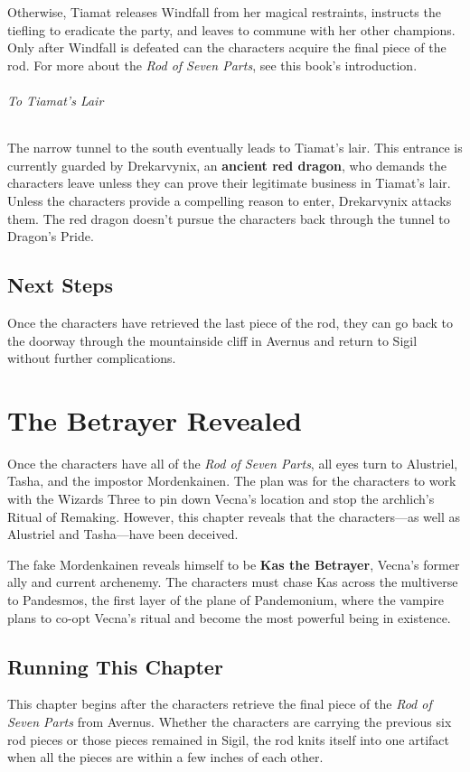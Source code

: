 \documentclass[10pt,a4paper,twoside,bg=print,twocolumn,openany,nodeprecatedcode]{dndbook}
\begin{document}
Otherwise, Tiamat releases Windfall from her magical restraints, instructs the tiefling to eradicate the party, and leaves to commune with her other champions. Only after Windfall is defeated can the characters acquire the final piece of the rod. For more about the \textit{Rod of Seven Parts}, see this book's introduction.

\subparagraph{To Tiamat's Lair}
The narrow tunnel to the south eventually leads to Tiamat's lair. This entrance is currently guarded by Drekarvynix, an \textbf{ancient red dragon}, who demands the characters leave unless they can prove their legitimate business in Tiamat's lair. Unless the characters provide a compelling reason to enter, Drekarvynix attacks them. The red dragon doesn't pursue the characters back through the tunnel to Dragon's Pride.

\section{Next Steps}
Once the characters have retrieved the last piece of the rod, they can go back to the doorway through the mountainside cliff in Avernus and return to Sigil without further complications.

\chapter{The Betrayer Revealed}
Once the characters have all of the \textit{Rod of Seven Parts}, all eyes turn to Alustriel, Tasha, and the impostor Mordenkainen. The plan was for the characters to work with the Wizards Three to pin down Vecna's location and stop the archlich's Ritual of Remaking. However, this chapter reveals that the characters—as well as Alustriel and Tasha—have been deceived.

The fake Mordenkainen reveals himself to be \textbf{Kas the Betrayer}, Vecna's former ally and current archenemy. The characters must chase Kas across the multiverse to Pandesmos, the first layer of the plane of Pandemonium, where the vampire plans to co-opt Vecna's ritual and become the most powerful being in existence.

\section{Running This Chapter}
This chapter begins after the characters retrieve the final piece of the \textit{Rod of Seven Parts} from Avernus. Whether the characters are carrying the previous six rod pieces or those pieces remained in Sigil, the rod knits itself into one artifact when all the pieces are within a few inches of each other.
\end{document}
